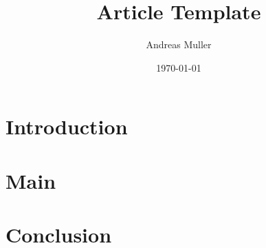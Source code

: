\documentclass[11pt,a4paper,titlepage,onecolumn]{article}
\title{Article Template}
\author{Andreas Muller}
\date{\today}
\begin{document}


\section{Introduction}

\section{Main}

\section{Conclusion}
\end{document}
